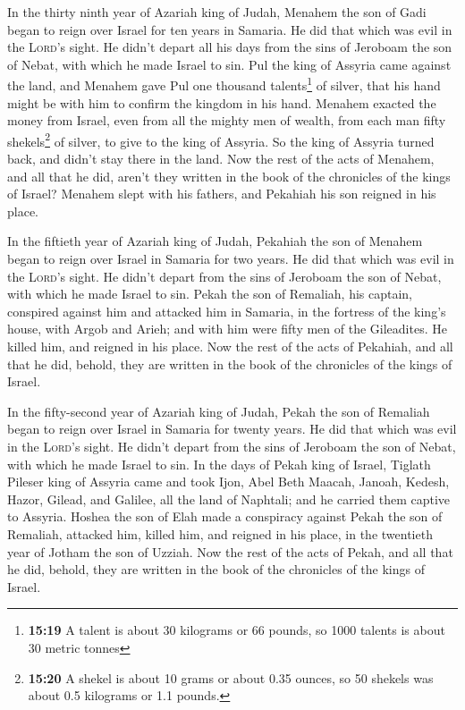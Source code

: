  In the thirty ninth year of Azariah king of Judah,
Menahem the son of Gadi began to reign over Israel for ten years in
Samaria.  He did that which was evil in the
\textsc{Lord}'s sight. He didn't depart all his days from the sins of
Jeroboam the son of Nebat, with which he made Israel to sin.
 Pul the king of Assyria came against the land, and
Menahem gave Pul one thousand talents\footnote{\textbf{15:19} A talent
  is about 30 kilograms or 66 pounds, so 1000 talents is about 30 metric
  tonnes} of silver, that his hand might be with him to confirm the
kingdom in his hand.  Menahem exacted the money from
Israel, even from all the mighty men of wealth, from each man fifty
shekels\footnote{\textbf{15:20} A shekel is about 10 grams or about 0.35
  ounces, so 50 shekels was about 0.5 kilograms or 1.1 pounds.} of
silver, to give to the king of Assyria. So the king of Assyria turned
back, and didn't stay there in the land.  Now the rest of
the acts of Menahem, and all that he did, aren't they written in the
book of the chronicles of the kings of Israel?  Menahem
slept with his fathers, and Pekahiah his son reigned in his place.

 In the fiftieth year of Azariah king of Judah, Pekahiah
the son of Menahem began to reign over Israel in Samaria for two years.
 He did that which was evil in the \textsc{Lord}'s sight.
He didn't depart from the sins of Jeroboam the son of Nebat, with which
he made Israel to sin.  Pekah the son of Remaliah, his
captain, conspired against him and attacked him in Samaria, in the
fortress of the king's house, with Argob and Arieh; and with him were
fifty men of the Gileadites. He killed him, and reigned in his place.
 Now the rest of the acts of Pekahiah, and all that he
did, behold, they are written in the book of the chronicles of the kings
of Israel.

 In the fifty-second year of Azariah king of Judah, Pekah
the son of Remaliah began to reign over Israel in Samaria for twenty
years.  He did that which was evil in the \textsc{Lord}'s
sight. He didn't depart from the sins of Jeroboam the son of Nebat, with
which he made Israel to sin.  In the days of Pekah king
of Israel, Tiglath Pileser king of Assyria came and took Ijon, Abel Beth
Maacah, Janoah, Kedesh, Hazor, Gilead, and Galilee, all the land of
Naphtali; and he carried them captive to Assyria.  Hoshea
the son of Elah made a conspiracy against Pekah the son of Remaliah,
attacked him, killed him, and reigned in his place, in the twentieth
year of Jotham the son of Uzziah.  Now the rest of the
acts of Pekah, and all that he did, behold, they are written in the book
of the chronicles of the kings of Israel.

